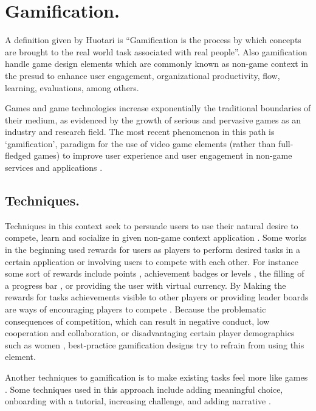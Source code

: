 \section{Gamification.}

A definition given by Huotari  \cite{huotari2012defining} is  “Gamification is
the process by which concepts are brought to the real world task associated with
real people”. Also gamification handle game design elements which are commonly
known as non-game context in the presud to  enhance user engagement,
organizational productivity, flow, learning, evaluations, among others.

Games and game technologies increase exponentially the traditional boundaries of
their medium, as evidenced by the growth of serious and pervasive games as an
industry and research field. The most recent phenomenon in this path is
‘gamification’, paradigm for the use of video game elements (rather than full-
fledged games) to improve user experience and user engagement in non-game
services and applications \cite{deterding2011gamification}.

\subsection{Techniques.}


Techniques in this context seek to persuade users to use their natural desire to
compete, learn and socialize in given non-game context application
\cite{deterding2011game}\cite{hamari2014does}. Some works in the beginning used
rewards for users as players to perform desired tasks in a certain application
or involving users to compete with each other. For instance some sort of
rewards include points \cite{sutter2010browse}, achievement badges or levels
\cite{hamari2011framework}, the filling of a progress bar \cite{o2010get}, or
providing the user with virtual currency. By Making the rewards for  tasks
achievements visible to other players or providing leader boards are ways of
encouraging players to compete \cite{hickman2010total}. Because the  problematic
consequences of competition, which can result in negative conduct, low
cooperation and collaboration, or disadvantaging certain player demographics
such as women \cite{kumar2013gamification}, best-practice gamification designs
try to refrain from using this element.

Another techniques to gamification is to make existing tasks feel more like
games \cite{deterding2010just}. Some techniques used in this approach include
adding meaningful choice, onboarding with a tutorial, increasing challenge, and
adding narrative \cite{mcgonigal2011reality}.

